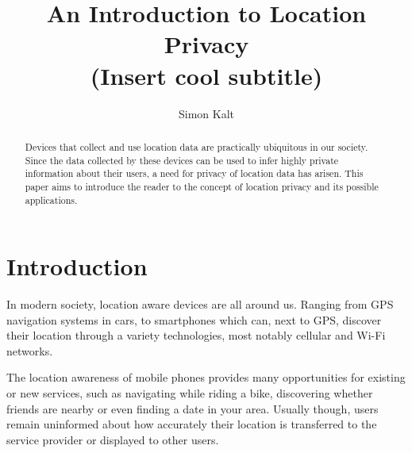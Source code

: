\documentclass[twocolumn, a4paper, 10pt]{article}
\begin{document}
\title{
    {\Large An Introduction to Location Privacy \\}
    {\large (Insert cool subtitle)}
}

\author{
    Simon Kalt
}

\maketitle

\def\abstractname{Abstract}
\begin{abstract}
{
Devices that collect and use location data are practically ubiquitous in our society. Since the data collected by these devices can be used to infer highly private information about their users, a need for privacy of location data has arisen. This paper aims to introduce the reader to the concept of location privacy and its possible applications.
}
\end{abstract}


\section{Introduction}
\label{sec:introduction}
In modern society, location aware devices are all around us. Ranging from GPS navigation systems in cars, to smartphones which can, next to GPS, discover their location through a variety technologies, most notably cellular and Wi-Fi networks.

The location awareness of mobile phones provides many opportunities for existing or new services, such as navigating while riding a bike, discovering whether friends are nearby or even finding a date in your area. Usually though, users remain uninformed about how accurately their location is transferred to the service provider or displayed to other users.

\lipsum[1-3]


{
    
    
}

\appendix
\end{document}

